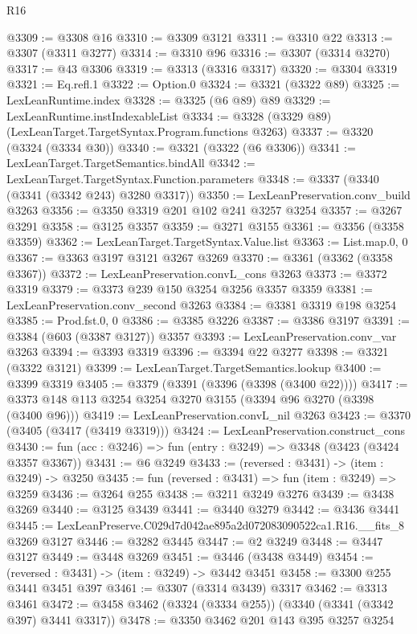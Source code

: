 \begin{lexlean}{R16}
\begin{coremodule}
@3309 := @3308 @16
@3310 := @3309 @3121
@3311 := @3310 @22
@3313 := @3307 (@3311 @3277)
@3314 := @3310 @96
@3316 := @3307 (@3314 @3270)
@3317 := @43 @3306
@3319 := @3313 (@3316 @3317)
@3320 := @3304 @3319
@3321 := Eq.refl.{1}
@3322 := Option.{0}
@3324 := @3321 (@3322 @89)
@3325 := LexLeanRuntime.index
@3328 := @3325 (@6 @89) @89
@3329 := LexLeanRuntime.instIndexableList
@3334 := @3328 (@3329 @89) (LexLeanTarget.TargetSyntax.Program.functions @3263)
@3337 := @3320 (@3324 (@3334 @30))
@3340 := @3321 (@3322 (@6 @3306))
@3341 := LexLeanTarget.TargetSemantics.bindAll
@3342 := LexLeanTarget.TargetSyntax.Function.parameters
@3348 := @3337 (@3340 (@3341 (@3342 @243) @3280 @3317))
@3350 := LexLeanPreservation.conv_build @3263
@3356 := @3350 @3319 @201 @102 @241 @3257 @3254
@3357 := @3267 @3291
@3358 := @3125 @3357
@3359 := @3271 @3155
@3361 := @3356 (@3358 @3359)
@3362 := LexLeanTarget.TargetSyntax.Value.list
@3363 := List.map.{0, 0}
@3367 := @3363 @3197 @3121 @3267 @3269
@3370 := @3361 (@3362 (@3358 @3367))
@3372 := LexLeanPreservation.convL_cons @3263
@3373 := @3372 @3319
@3379 := @3373 @239 @150 @3254 @3256 @3357 @3359
@3381 := LexLeanPreservation.conv_second @3263
@3384 := @3381 @3319 @198 @3254
@3385 := Prod.fst.{0, 0}
@3386 := @3385 @3226
@3387 := @3386 @3197
@3391 := @3384 (@603 (@3387 @3127)) @3357
@3393 := LexLeanPreservation.conv_var @3263
@3394 := @3393 @3319
@3396 := @3394 @22 @3277
@3398 := @3321 (@3322 @3121)
@3399 := LexLeanTarget.TargetSemantics.lookup
@3400 := @3399 @3319
@3405 := @3379 (@3391 (@3396 (@3398 (@3400 @22))))
@3417 := @3373 @148 @113 @3254 @3254 @3270 @3155 (@3394 @96 @3270 (@3398 (@3400 @96)))
@3419 := LexLeanPreservation.convL_nil @3263
@3423 := @3370 (@3405 (@3417 (@3419 @3319)))
@3424 := LexLeanPreservation.construct_cons
@3430 := fun (acc : @3246) => fun (entry : @3249) => @3348 (@3423 (@3424 @3357 @3367))
@3431 := @6 @3249
@3433 := (reversed : @3431) -> (item : @3249) -> @3250
@3435 := fun (reversed : @3431) => fun (item : @3249) => @3259
@3436 := @3264 @255
@3438 := @3211 @3249 @3276
@3439 := @3438 @3269
@3440 := @3125 @3439
@3441 := @3440 @3279
@3442 := @3436 @3441
@3445 := LexLeanPreserve.C029d7d042ae895a2d072083090522ca1.R16.__fits_8 @3269 @3127
@3446 := @3282 @3445
@3447 := @2 @3249
@3448 := @3447 @3127
@3449 := @3448 @3269
@3451 := @3446 (@3438 @3449)
@3454 := (reversed : @3431) -> (item : @3249) -> @3442 @3451
@3458 := @3300 @255 @3441 @3451 @397
@3461 := @3307 (@3314 @3439) @3317
@3462 := @3313 @3461
@3472 := @3458 @3462 (@3324 (@3334 @255)) (@3340 (@3341 (@3342 @397) @3441 @3317))
@3478 := @3350 @3462 @201 @143 @395 @3257 @3254

\end{coremodule}
\end{lexlean}
